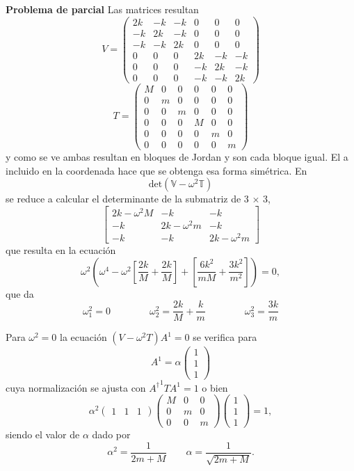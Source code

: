 \documentclass[10pt,oneside]{CBFT_book}
\begin{document}
\begin{ejemplo}{\bf Problema de parcial}
Las matrices resultan 
\[
	V = \begin{pmatrix}
	     2 k & -k & -k & 0 & 0 & 0 \\
	     -k & 2k & -k & 0 & 0 & 0 \\
	     -k & -k & 2k & 0 & 0 & 0 \\
	     0 & 0 & 0 & 2k & -k & -k \\
	     0 & 0 & 0 & -k & 2k & -k \\
	     0 & 0 & 0 & -k & -k & 2k
	    \end{pmatrix}
\]
\[
	T = \begin{pmatrix}
	     M & 0 & 0 & 0 & 0 & 0 \\
	     0 & m & 0 & 0 & 0 & 0 \\
	     0 & 0 & m & 0 & 0 & 0 \\
	     0 & 0 & 0 & M & 0 & 0 \\
	     0 & 0 & 0 & 0 & m & 0 \\
	     0 & 0 & 0 & 0 & 0 & m 
	    \end{pmatrix}
\]
y como se ve ambas resultan en bloques de Jordan y son cada bloque igual. El a incluido en la coordenada hace que se
obtenga esa forma simétrica.
En
\[
	\mbox{det}( \mathbb{V} - \omega^2 \mathbb{T} )
\]
se reduce a calcular el determinante de la submatriz de 3 $\times$ 3,
\[
	\begin{bmatrix}
	2 k - \omega^2 M & -k & -k \\
	-k & 2 k - \omega^2 m & -k \\
	-k & -k & 2 k - \omega^2 m 
	\end{bmatrix}
\]
que resulta en la ecuación 
\[
	\omega^2 \left( \omega^4 - \omega^2 \left[  \frac{2k}{M} + \frac{2k}{M} \right] +
	\left[ \frac{6k^2}{mM} + \frac{3k^2}{m^2} \right] \right) = 0,
\]
que da 
\[
	\omega_1^2 = 0 \qquad \qquad \omega_2^2 = \frac{2k}{M} + \frac{k}{m} \qquad \qquad \omega_3^2 = \frac{3k}{m} 
\]

Para $\omega^2 = 0$ la ecuación $ (V - \omega^2 T )A^1 = 0 $ se verifica para 
\[
	A^1 = \alpha \begin{pmatrix} 1 \\ 1 \\ 1 \end{pmatrix}
\]
cuya normalización se ajusta con $ {A^\dagger}^1 T A^1 = 1$ o bien 
\[
	\alpha^2 \begin{pmatrix} 1 & 1 & 1 \end{pmatrix}
	\begin{pmatrix}
	 M & 0 & 0 \\
	 0 & m & 0 \\
	 0 & 0 & m
	\end{pmatrix}
	\begin{pmatrix} 1 \\ 1 \\ 1 \end{pmatrix} = 1,
\]
siendo el valor de $\alpha$ dado por 
\[
	\alpha^2 = \frac{1}{2m+M} \qquad \alpha = \frac{1}{ \sqrt{2m+M} }.
\]


\end{ejemplo}
\end{document}
